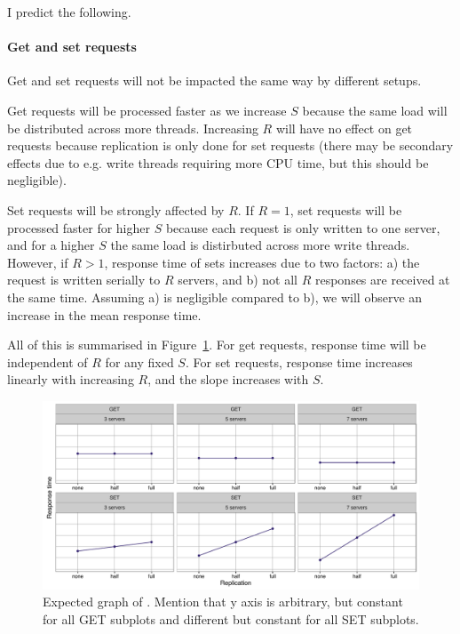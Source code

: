 \documentclass[11pt]{article}
\newcommand{\todo}[1]{\fcolorbox{black}{Apricot}{TODO: #1}}
\begin{document}
I predict the following.

\paragraph{Get and set requests}
Get and set requests will not be impacted the same way by different setups.

Get requests will be processed faster as we increase $S$ because the same load will be distributed across more threads. Increasing $R$ will have no effect on get requests because replication is only done for set requests (there may be secondary effects due to e.g. write threads requiring more CPU time, but this should be negligible).

Set requests will be strongly affected by $R$. If $R=1$, set requests will be processed faster for higher $S$ because each request is only written to one server, and for a higher $S$ the same load is distirbuted across more write threads. However, if $R>1$, response time of sets increases due to two factors: a) the request is written serially to $R$ servers, and b) not all $R$ responses are received at the same time. Assuming a) is negligible compared to b), we will observe an increase in the mean response time.

All of this is summarised in Figure~\ref{fig:exp2:hyp:replication}. For get requests, response time will be independent of $R$ for any fixed $S$. For set requests, response time increases linearly with increasing $R$, and the slope increases with $S$.

\begin{figure}[h]
\centering
\includegraphics[width=\textwidth]{figures/hypothesis_replication.pdf}
\caption{Expected graph of \todo{}. Mention that y axis is arbitrary, but constant for all GET subplots and different but constant for all SET subplots.}
\label{fig:exp2:hyp:replication}
\end{figure}
\end{document}
